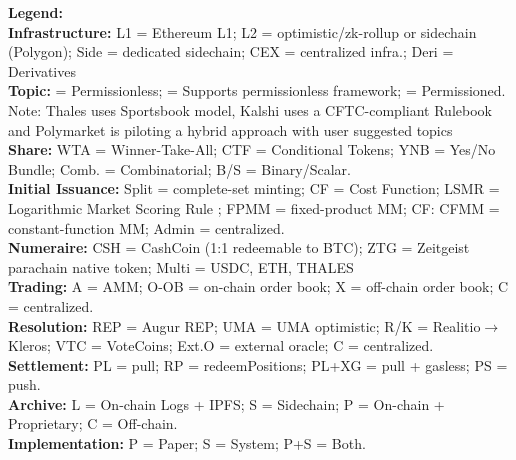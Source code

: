 \begin{table}[t]
\vspace{0.30em}
\begin{minipage}{\textwidth}
\footnotesize
\textbf{Legend:} \\
\textbf{Infrastructure:} L1 = Ethereum L1; L2 = optimistic/zk-rollup or sidechain (Polygon); Side = dedicated sidechain; CEX = centralized infra.; Deri = Derivatives\\
\textbf{Topic:} \Circle = Permissionless; \LEFTcircle = Supports permissionless framework; \CIRCLE = Permissioned. Note: Thales uses Sportsbook model, Kalshi uses a CFTC-compliant Rulebook and Polymarket is piloting a hybrid approach with user suggested topics\\
\textbf{Share:} WTA = Winner-Take-All; CTF = Conditional Tokens; YNB = Yes/No Bundle; Comb. = Combinatorial; B/S = Binary/Scalar. \\
\textbf{Initial Issuance:} Split = complete-set minting; CF = Cost Function; LSMR = Logarithmic Market Scoring Rule ; FPMM = fixed-product MM; CF: CFMM = constant-function MM; Admin = centralized. \\
\textbf{Numeraire:} CSH = CashCoin (1:1 redeemable to BTC); ZTG = Zeitgeist parachain native token; Multi = USDC, ETH, THALES \\
\textbf{Trading:} A = AMM; O-OB = on-chain order book; X = off-chain order book; C = centralized. \\
\textbf{Resolution:} REP = Augur REP; UMA = UMA optimistic; R/K = Realitio$\rightarrow$Kleros; VTC = VoteCoins; Ext.O = external oracle; C = centralized. \\
\textbf{Settlement:} PL = pull; RP = redeemPositions; PL+XG = pull + gasless; PS = push. \\
\textbf{Archive:} L = On-chain Logs + IPFS; S = Sidechain; P = On-chain + Proprietary; C = Off-chain. \\
\textbf{Implementation:} P = Paper; S = System; P+S = Both.
\end{minipage}
\end{table}